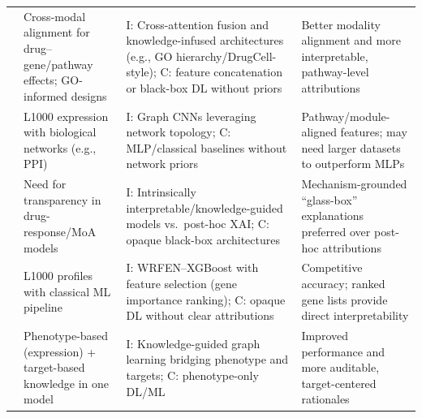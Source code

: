 \documentclass[twocolumn]{article}
\begin{document}
{\begin{table}[t]
\begin{tabular}{p{3.1cm} p{4.8cm} p{5.8cm} p{3.3cm}}
    \cite{elabd2024simple} &
    Cross-modal alignment for drug–gene/pathway effects; GO-informed designs &
    I\@: Cross-attention fusion and knowledge-infused architectures (e.g., GO hierarchy/DrugCell-style); 
    C\@: feature concatenation or black-box DL without priors &
    Better modality alignment and more interpretable, pathway-level attributions \\[0.35em]

    \cite{mcdermott2019deep} &
    L1000 expression with biological networks (e.g., PPI) &
    I\@: Graph CNNs leveraging network topology; 
    C\@: MLP/classical baselines without network priors &
    Pathway/module-aligned features; may need larger datasets to outperform MLPs \\[0.35em]

    \cite{samal2022opportunities} &
    Need for transparency in drug-response/MoA models &
    I\@: Intrinsically interpretable/knowledge-guided models vs.\ post-hoc XAI; 
    C\@: opaque black-box architectures &
    Mechanism-grounded “glass-box” explanations preferred over post-hoc attributions \\[0.35em]

    \cite{lu2021drug} &
    L1000 profiles with classical ML pipeline &
    I\@: WRFEN–XGBoost with feature selection (gene importance ranking); 
    C\@: opaque DL without clear attributions &
    Competitive accuracy; ranked gene lists provide direct interpretability \\[0.35em]

    \cite{ye2025knowledge} &
    Phenotype-based (expression) + target-based knowledge in one model &
    I\@: Knowledge-guided graph learning bridging phenotype and targets; 
    C\@: phenotype-only DL/ML &
    Improved performance and more auditable, target-centered rationales \\
    \bottomrule
  \end{tabular}
\end{table}
\clearpage
}
\end{document}
